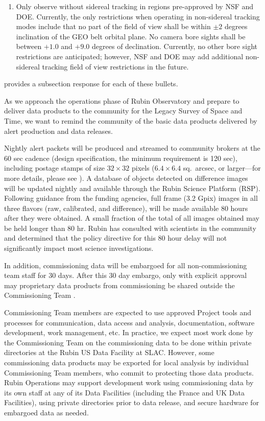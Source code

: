 \begin{enumerate}
\item	Only observe without sidereal tracking in regions pre-approved by NSF and DOE.
Currently, the only restrictions when operating in non-sidereal tracking modes include that no part of the field of view shall be within $\pm 2$ degrees  inclination of the \gls{GEO} belt orbital plane.
No camera bore sights shall be between $+1.0$ and $+9.0$ degrees of declination.
Currently, no other bore sight restrictions are anticipated; however, NSF and DOE may add additional non-sidereal tracking field of view restrictions in the future.


\end{enumerate}

 provides a subsection response for each of these bullets.

As we approach the operations phase of Rubin Observatory and prepare to deliver data products to the community for the Legacy Survey of Space and Time, we want to remind the community of the basic data products delivered by alert production and data releases.

Nightly alert packets will be produced and streamed to community brokers at the 60 sec cadence (design specification, the minimum requirement is 120 sec), including postage stamps of size $32 \times 32$ pixels ($6.4 \times 6.4$ sq.\ arcsec, or larger---for more details, please see ).
A database of objects detected on difference images will be updated nightly and available through the Rubin Science Platform (RSP).
Following guidance from the funding agencies, full frame (3.2 Gpix) images in all three flavors (raw, calibrated, and difference), will be made available 80 hours after they were obtained.
A small fraction of the total of all images obtained may be held longer than 80 hr.
Rubin has consulted with scientists in the community and determined that the policy directive for this 80 hour delay will not significantly impact most science investigations.

In addition, commissioning data will be embargoed for all non-commissioning team staff for 30 days.
After this 30 day embargo, only with explicit approval may proprietary data products from commissioning be shared outside the Commissioning Team   .

Commissioning Team members are expected to use approved Project tools and processes for communication, data access and analysis, documentation, software development, work management, etc.
In practice, we expect most work done by the Commissioning Team on the commissioning data to be done within private directories at the Rubin US Data Facility at SLAC.
However, some commissioning data products may be exported for local analysis by individual Commissioning Team members, who commit to protecting those data products.
Rubin Operations may support development work using commissioning data by its own staff at any of its Data Facilities (including the France and UK Data Facilities), using private directories prior to data release, and secure hardware for embargoed data as needed.

